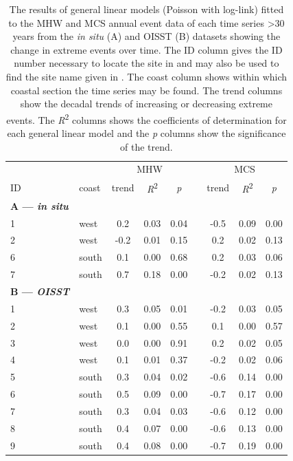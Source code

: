 \documentclass[a4paper,10pt,review]{elsarticle}
\begin{document}
\begin{table}[]
\centering
\caption{\small The results of general linear models (Poisson with log-link) fitted to the MHW and MCS annual event data of each time series >30 years from the \emph{in situ} (A) and OISST (B) datasets showing the change in extreme events over time. The ID column gives the ID number necessary to locate the site in  and may also be used to find the site name given in . The coast column shows within which coastal section the time series may be found. The trend columns show the decadal trends of increasing or decreasing extreme events. The \emph{R}\textsuperscript{2} columns shows the coefficients of determination for each general linear model and the \emph{p} columns show the significance of the trend.}
\label{table4}
\begin{tiny}
\begin{tabular}{llccccccc}
\toprule
&& \multicolumn{3}{c}{MHW} & \phantom{abc} & \multicolumn{3}{c}{MCS} \\
\cmidrule{3-5} \cmidrule{7-9}
ID & coast & trend & \emph{R}\textsuperscript{2} & \emph{p} && trend & \emph{R}\textsuperscript{2} & \emph{p} \\
\midrule
{\bf{A} --- \emph{in situ}} \\
1 & west & 0.2 & 0.03 & 0.04 && -0.5 & 0.09 & 0.00 \\ 
  2 & west & -0.2 & 0.01 & 0.15 && 0.2 & 0.02 & 0.13 \\ 
  6 & south & 0.1 & 0.00 & 0.68 && 0.2 & 0.03 & 0.06 \\ 
  7 & south & 0.7 & 0.18 & 0.00 && -0.2 & 0.02 & 0.13 \\
{\bf{B} --- \emph{OISST}} \\
  1 & west & 0.3 & 0.05 & 0.01 && -0.2 & 0.03 & 0.05 \\ 
  2 & west & 0.1 & 0.00 & 0.55 && 0.1 & 0.00 & 0.57 \\ 
  3 & west & 0.0 & 0.00 & 0.91 && 0.2 & 0.02 & 0.05 \\ 
  4 & west & 0.1 & 0.01 & 0.37 && -0.2 & 0.02 & 0.06 \\ 
  5 & south & 0.3 & 0.04 & 0.02 && -0.6 & 0.14 & 0.00 \\ 
  6 & south & 0.5 & 0.09 & 0.00 && -0.7 & 0.17 & 0.00 \\ 
  7 & south & 0.3 & 0.04 & 0.03 && -0.6 & 0.12 & 0.00 \\ 
  8 & south & 0.4 & 0.07 & 0.00 && -0.6 & 0.13 & 0.00 \\ 
  9 & south & 0.4 & 0.08 & 0.00 && -0.7 & 0.19 & 0.00 \\ 

\end{tabular}
\end{tiny}
\end{table}
\end{document}

